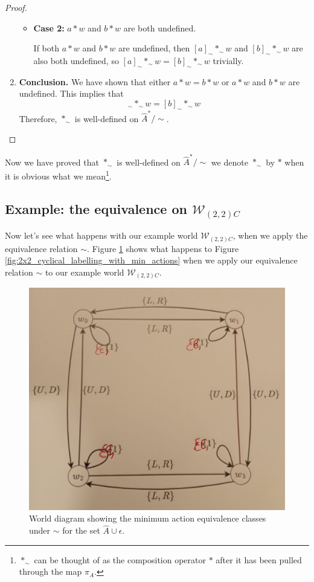 \begin{proof}
\begin{enumerate}[(1)]
\begin{itemize}
            \item \textbf{Case 2:} $a \ast w$ and $b \ast w$ are both undefined.

            If both $a \ast w$ and $b \ast w$ are undefined, then $[a]_{\sim} \ast_{\sim} w$ and $[b]_{\sim} \ast_{\sim} w$ are also both undefined, so $[a]_{\sim} \ast_{\sim} w = [b]_{\sim} \ast_{\sim} w$ trivially.
        \end{itemize}

        \item \textbf{Conclusion.}
        We have shown that either $a \ast w = b \ast w$ or $a \ast w$ and $b \ast w$ are undefined.
        This implies that
        \begin{equation}
            [a]_{\sim} \ast_{\sim} w = [b]_{\sim} \ast_{\sim} w
        \end{equation}
        Therefore, $\ast_{\sim}$ is well-defined on $\hat{A}^{\ast}/\sim$.
    \end{enumerate}
\end{proof}

Now we have proved that $\ast_{\sim}$ is well-defined on $\hat{A}^{\ast}/\sim$ we denote $\ast_{\sim}$ by $\ast$ when it is obvious what we mean\footnote{$\ast_{\sim}$ can be thought of as the composition operator $\ast$ after it has been pulled through the map $\pi_{A}$.}.

\subsection{Example: the equivalence on $\mathscr{W}_{(2,2)C}$}

Now let's see what happens with our example world $\mathscr{W}_{(2,2)C}$, when we apply the equivalence relation $\sim$.
Figure \ref{fig:2x2_cyclical_equivalence_min_actions} shows what happens to Figure \ref{fig:2x2_cyclical_labelling_with_min_actions} when we apply our equivalence relation $\sim$ to our example world $\mathscr{W}_{(2,2)C}$.

\begin{figure}[H]
    \centering
    \includegraphics[width=0.5\linewidth]{2MathematicalFramework/InitialFramework/Images/2x2_cyclical_equivalence_min_actions.jpeg}
    \caption{World diagram showing the minimum action equivalence classes under $\sim$ for the set $\hat{A} \cup \epsilon$.}
    \label{fig:2x2_cyclical_equivalence_min_actions}
\end{figure}

